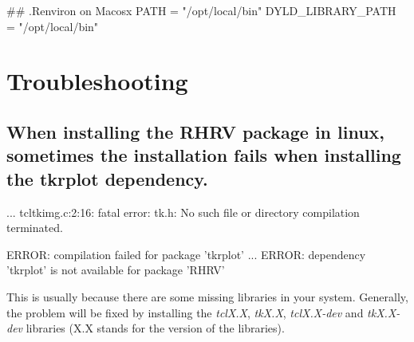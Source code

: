 \begin{Schunk}
\begin{Sinput}
## .Renviron on Macosx
PATH = "/opt/local/bin"
DYLD_LIBRARY_PATH = "/opt/local/bin"
\end{Sinput}
\end{Schunk}


\section{Troubleshooting} 
\subsection[tkrplot dependency]{When installing the RHRV package in linux, sometimes the installation fails when installing the tkrplot dependency.}
\begin{Schunk}
\begin{Sinput}
...
tcltkimg.c:2:16: fatal error: tk.h: No such file or directory
compilation terminated.

ERROR: compilation failed for package 'tkrplot'
...
ERROR: dependency 'tkrplot' is not available for package 'RHRV'
\end{Sinput}
\end{Schunk}

This is usually because there are some missing libraries in your system. Generally, the problem will be fixed by installing the \textit{tclX.X}, \textit{tkX.X}, \textit{tclX.X-dev} and  \textit{tkX.X-dev} libraries (X.X stands for the version of the libraries). 


